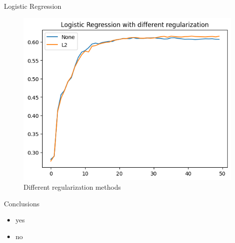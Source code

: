 \documentclass{beamer}
\begin{document}
\begin{frame}[t]{Logistic Regression}
\pause
{} {
	\vspace{-3mm}
	\begin{figure}[h]
		\caption{Different regularization methods}
		\centering
		\includegraphics[width=0.73\linewidth]{images/LogisticRegression/none_l2_regularization.png}
	\end{figure}
}
\end{frame}


\begin{frame}[t]{Conclusions}
\begin{itemize}[<+->]
	\item yes
	\item no
\end{itemize}
\end{frame}
\end{document}
